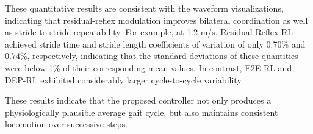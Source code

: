 \documentclass[acmtog,screen]{acmart}
\begin{document}
These quantitative results are consistent with the waveform visualizations, indicating that residual-reflex modulation improves bilateral coordination as well as stride-to-stride repeatability. For example, at 1.2 m/s, Residual-Reflex RL achieved stride time and stride length coefficients of variation of only 0.70\% and 0.74\%, respectively, indicating that the standard deviations of these quantities were below 1\% of their corresponding mean values. In contrast, E2E-RL and DEP-RL exhibited considerably larger cycle-to-cycle variability.

These results indicate that the proposed controller not only produces a physiologically plausible average gait cycle, but also maintains consistent locomotion over successive steps.


\begin{table}[!t]
\centering
\caption{Cycle-level left--right waveform differences and stride variability.
Hip, knee, ankle, and GRF columns report $D_y$, the RMS difference between the
average left and right gait-cycle waveforms. Time CV and Length CV report
$100\sigma_z/\mu_z$ for stride time and stride length. Lower values indicate
more symmetric or more repeatable gait.}
\label{tab:symmetry_variability}
\small
\setlength{\tabcolsep}{3.5pt}
\renewcommand{\arraystretch}{1.12}
\end{table}
\end{document}
